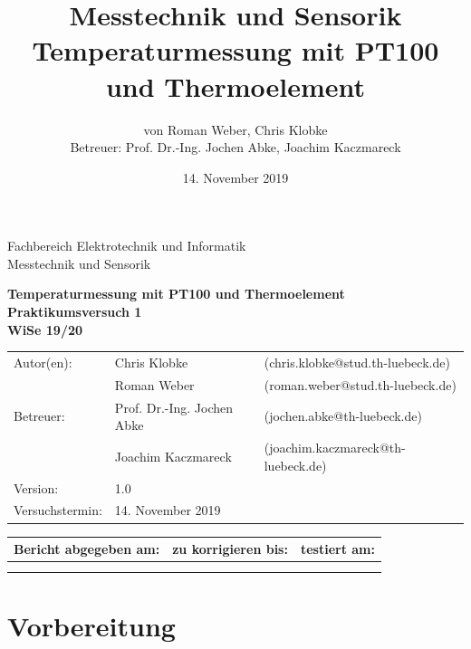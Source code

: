 \documentclass[a4paper,11pt,oneside]{article}
\author{von Roman Weber, Chris Klobke\\Betreuer: Prof. Dr.-Ing. Jochen Abke, Joachim Kaczmareck}
\title{Messtechnik und Sensorik\\Temperaturmessung mit PT100 und Thermoelement}
\date{14. November 2019}
\begin{document}
\pagestyle{empty}

Fachbereich Elektrotechnik und Informatik \\
Messtechnik und Sensorik


\begin{center}

\LARGE\textbf{Temperaturmessung mit PT100 und Thermoelement} \\
\LARGE\textbf{Praktikumsversuch 1} \\
\LARGE\textbf{WiSe 19/20} \\

\vspace{2.0cm}

\end{center}

\vspace{5.0cm}

\begin{tabular}{lll}
  Autor(en): & Chris Klobke & (chris.klobke@stud.th-luebeck.de) \\
  			 & Roman Weber & (roman.weber@stud.th-luebeck.de) \\
  Betreuer: & Prof. Dr.-Ing. Jochen Abke & (jochen.abke@th-luebeck.de) \\
  			& Joachim Kaczmareck & (joachim.kaczmareck@th-luebeck.de) \\
  Version: & 1.0 & \\
  Versuchstermin: & 14. November 2019 & \\
\end{tabular}

\vspace{1.0cm}


\vspace{2.0cm}
\begin{table}[h]
\centering
\begin{tabular}{|c|c|c|}
\hline
\textbf{Bericht abgegeben am:} & \textbf{zu korrigieren bis:} & \textbf{testiert am:} \\ \hline
\rule{0pt}{1.0cm}  &  & \multirow{2}{*}{} \\ \cline{1-2}
\rule{0pt}{1.0cm}  &  & \rule{4cm}{0cm} \\ \hline
\end{tabular}%
\end{table}
\newpage
\tableofcontents
\pagestyle{fancy}
\newpage
\section{Vorbereitung}
\end{document}
